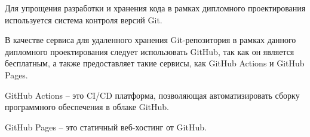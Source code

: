 Для упрощения разработки и хранения кода в рамках дипломного проектирования используется система контроля версий Git.

В качестве сервиса для удаленного хранения Git-репозитория в рамках данного дипломного проектирования следует использовать GitHub, так как он является бесплатным, а также предоставляет такие сервисы, как GitHub Actions и GitHub Pages.

GitHub Actions -- это CI/CD платформа, позволяющая автоматизировать сборку программного обеспечения в облаке GitHub.

GitHub Pages -- это статичный веб-хостинг от GitHub.
